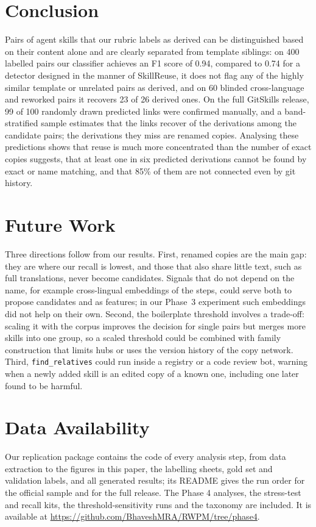 \documentclass[sigconf,screen]{acmart}
\begin{document}
\section{Conclusion}
\label{sec:conclusion}
 
Pairs of agent skills that our rubric labels as derived can be distinguished based on their content alone and are clearly separated from template siblings: on 400 labelled pairs our classifier achieves an F1 score of 0.94, compared to 0.74 for a detector designed in the manner of SkillReuse, it does not flag any of the highly similar template or unrelated pairs as derived, and on 60 blinded cross-language and reworked pairs it recovers 23 of 26 derived ones. On the full GitSkills release, 99 of 100 randomly drawn predicted links were confirmed manually, and a band-stratified sample estimates that the links recover \ResRCRecall{} of the derivations among the candidate pairs; the derivations they miss are renamed copies. Analysing these predictions shows that reuse is much more concentrated than the number of exact copies suggests, that at least one in six predicted derivations cannot be found by exact or name matching, and that 85\% of them are not connected even by git history.


\section{Future Work}
\label{sec:future}
 
Three directions follow from our results. First, renamed copies are the main gap: they are where our recall is lowest, and those that also share little text, such as full translations, never become candidates. Signals that do not depend on the name, for example cross-lingual embeddings of the steps, could serve both to propose candidates and as features; in our Phase~3 experiment such embeddings did not help on their own. Second, the boilerplate threshold involves a trade-off: scaling it with the corpus improves the decision for single pairs but merges more skills into one group, so a scaled threshold could be combined with family construction that limits hubs or uses the version history of the copy network. Third, \texttt{find\_relatives} could run inside a registry or a code review bot, warning when a newly added skill is an edited copy of a known one, including one later found to be harmful.


\section*{Data Availability}
Our replication package contains the code of every analysis step, from data extraction to the figures in this paper, the labelling sheets, gold set and validation labels, and all generated results; its README gives the run order for the official sample and for the full release. The Phase 4 analyses, the stress-test and recall kits, the threshold-sensitivity runs and the taxonomy are included. It is available at \url{https://github.com/BhaveshMRA/RWPM/tree/phase4}.
\end{document}
